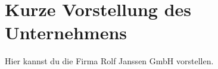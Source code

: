 
\section{Kurze Vorstellung des Unternehmens}
\label{chap:vorstellung_unternehmen}

Hier kannst du die Firma Rolf Janssen GmbH vorstellen.